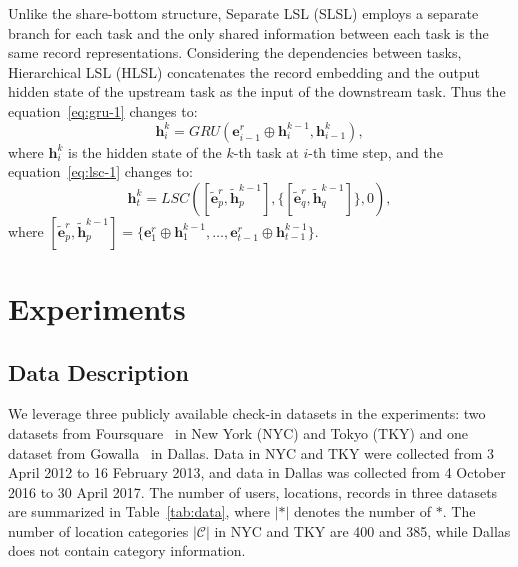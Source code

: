 \documentclass[sigconf]{acmart}
\begin{document}
    Unlike the share-bottom structure, Separate LSL (SLSL) employs a separate branch for each task and the only shared information between each task is the same record representations. 
    Considering the dependencies between tasks, Hierarchical LSL (HLSL) concatenates the record embedding and the output hidden state of the upstream task as the input of the downstream task. Thus the equation~\ref{eq:gru-1} changes to: 
    \begin{equation}
        \boldsymbol{h}^k_i = GRU(\boldsymbol{e}^r_{i-1} \oplus \boldsymbol{h}^{k-1}_i, \boldsymbol{h}^k_{i-1}),
    \end{equation}
    where $\boldsymbol{h}^k_i$ is the hidden state of the $k$-th task at $i$-th time step, and the equation~\ref{eq:lsc-1} changes to:
    \begin{equation}
        \boldsymbol{h}^k_t = LSC([\widetilde{\boldsymbol{e}}^r_p,\widetilde{\boldsymbol{h}}^{k-1}_p], \{[\widetilde{\boldsymbol{e}}^r_q,\widetilde{\boldsymbol{h}}^{k-1}_q]\}, 0),
    \end{equation}
    where $[\widetilde{\boldsymbol{e}}^r_p,\widetilde{\boldsymbol{h}}^{k-1}_p] = \{\boldsymbol{e}^r_1 \oplus \boldsymbol{h}^{k-1}_1 , \dots,\boldsymbol{e}^r_{t-1} \oplus \boldsymbol{h}^{k-1}_{t-1}\}$.
    
     

\section{Experiments}
\subsection{Data Description}
    We leverage three publicly available check-in datasets in the experiments: two datasets from Foursquare~\cite{yang2014modeling} in New York (NYC) and Tokyo (TKY) and one dataset from Gowalla~\cite{cho2011friendship} in Dallas. Data in NYC and TKY were collected from 3 April 2012 to 16 February 2013, and data in Dallas was collected from 4 October 2016 to 30 April 2017. The number of users, locations, records in three datasets are summarized in Table~\ref{tab:data}, where $|\mathcal{*}|$ denotes the number of $*$. The number of location categories $|\mathcal{C}|$ in NYC and TKY are 400 and 385, while Dallas does not contain category information.
    
\end{document}
